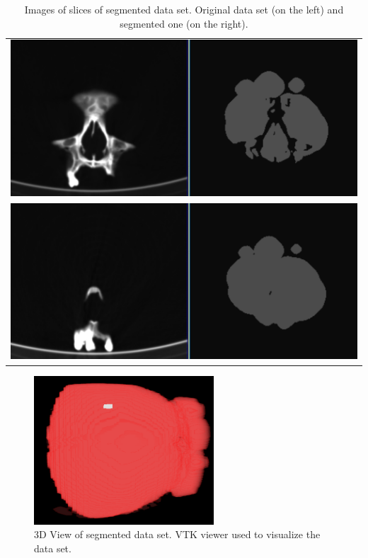 \begin{table}[ht]
    \centering
    \begin{tabular}{c}
    \includegraphics[scale=.5]{data/png/29}\\
    \newline
    \includegraphics[scale=.5]{data/png/31}\\
    \end{tabular}
    \caption[Segmented data set]
{
Images of slices of segmented data set. Original data set (on the left) and segmented one (on the right).
}
\end{table}%


\begin{figure}[h]
    \centering
    \includegraphics[width=0.6\textwidth]{data/png/3d}
    \caption[Series3DView]
{
3D View of segmented data set. VTK viewer used to visualize the data set.
}
    \label{fg:series3d}
\end{figure}
